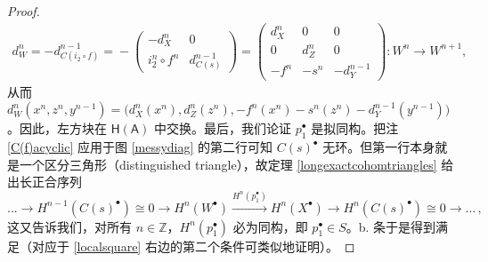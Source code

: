 \begin{proof}
\begin{align*}
		d_W^n=-d_{C(i_2\circ f)}^{n-1}=\!-\!\begin{pmatrix} -d_X^n & 0 \\ i_2^n\circ f^n & d_{C(s)}^{n-1} \end{pmatrix} \!=\! \begin{pmatrix}
			d_X^n & 0 & 0 \\ 0 & d_Z^n & 0 \\ -f^n & -s^n & -d_Y^{n-1}
		\end{pmatrix}\!:W^n\rightarrow W^{n+1},
	\end{align*}
	从而 $d_W^n(x^n,z^n,y^{n-1})=\big(d_X^n(x^n), d_Z^n(z^n),-f^n(x^n)-s^n(z^n)-d_Y^{n-1}(y^{n-1})\big)$。因此，左方块在 $\mathsf{H(A)}$ 中交换。最后，我们论证 $p_1^\bullet$ 是拟同构。把注 \ref{C(f)acyclic} 应用于图 \eqref{messydiag} 的第二行可知 $C(s)^\bullet$ 无环。但第一行本身就是一个区分三角形（distinguished triangle），故定理 \ref{longexactcohomtriangles} 给出长正合序列
	\[
	...\rightarrow H^{n-1}(C(s)^\bullet)\cong 0 \rightarrow H^{n}(W^\bullet)\xrightarrow{H^n(p_1^\bullet)} H^{n}(X^\bullet)\rightarrow H^{n}(C(s)^\bullet)\cong 0\rightarrow...\,,
	\]
	这又告诉我们，对所有 $n\in\mathbb{Z}$，$H^n(p_1^\bullet)$ 必为同构，即 $p_1^\bullet\in S$。b. 条于是得到满足（对应于 \eqref{localsquare} 右边的第二个条件可类似地证明）。
	

\end{proof}
